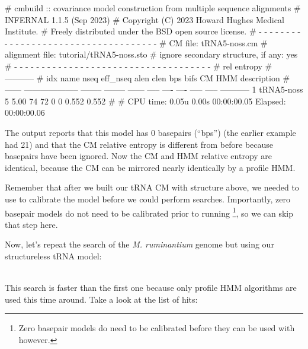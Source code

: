\begin{sreoutput}
# cmbuild :: covariance model construction from multiple sequence alignments
# INFERNAL 1.1.5 (Sep 2023)
# Copyright (C) 2023 Howard Hughes Medical Institute.
# Freely distributed under the BSD open source license.
# - - - - - - - - - - - - - - - - - - - - - - - - - - - - - - - - - - - -
# CM file:                                            tRNA5-noss.cm
# alignment file:                                     tutorial/tRNA5-noss.sto
# ignore secondary structure, if any:                 yes
# - - - - - - - - - - - - - - - - - - - - - - - - - - - - - - - - - - - -
#                                                                      rel entropy
#                                                                      -----------
# idx    name                     nseq eff_nseq   alen  clen  bps bifs    CM   HMM description
# ------ -------------------- -------- -------- ------ ----- ---- ---- ----- ----- -----------
       1 tRNA5-noss                  5     5.00     74    72    0    0 0.552 0.552 
#
# CPU time: 0.05u 0.00s 00:00:00.05 Elapsed: 00:00:00.06
\end{sreoutput}

The output reports that this model has 0 basepairs (``bps'') (the
earlier example had 21) and that the CM relative entropy is different
from before because basepairs have been ignored. Now the CM and HMM 
relative entropy are identical, because the CM can be mirrored nearly
identically by a profile HMM.

Remember that after we built our tRNA CM with structure above, we
needed to use  to calibrate the model before we
could perform searches. Importantly, zero basepair models do not need
to be calibrated prior to running \footnote{Zero
  basepair models do need to be calibrated before they can be used
  with  however.}, so we can skip that step here. 

Now, let's repeat the search of the \emph{M. ruminantium} genome but
using our structureless tRNA model: 

\\

This search is faster than the first one because only profile HMM
algorithms are used this time around. Take a look at the list of hits:

